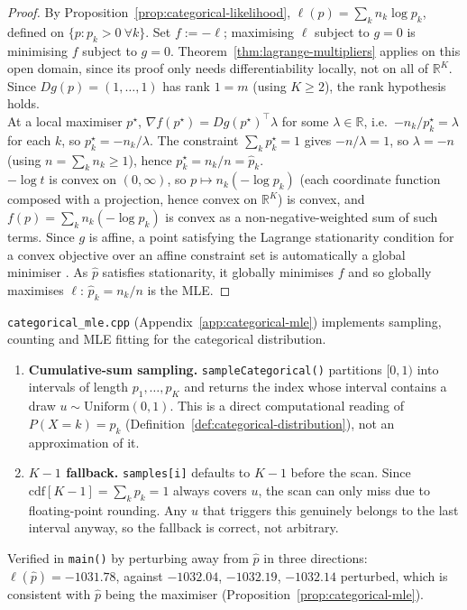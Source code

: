 		\begin{proof}
			By Proposition~\ref{prop:categorical-likelihood}, $\ell(p)=\sum_kn_k\log p_k$, defined on $\{p:p_k>0\ \forall k\}$. Set $f:=-\ell$; maximising $\ell$ subject to $g=0$ is minimising $f$ subject to $g=0$. Theorem~\ref{thm:lagrange-multipliers} applies on this open domain, since its proof only needs differentiability locally, not on all of $\mathbb{R}^K$. Since $Dg(p)=(1,\dots,1)$ has rank $1=m$ (using $K\ge2$), the rank hypothesis holds. \\
			
			At a local maximiser $p^\star$, $\nabla f(p^\star)=Dg(p^\star)^\top\lambda$ for some $\lambda\in\mathbb{R}$, i.e.\ $-n_k/p_k^\star=\lambda$ for each $k$, so $p_k^\star=-n_k/\lambda$. The constraint $\sum_kp_k^\star=1$ gives $-n/\lambda=1$, so $\lambda=-n$ (using $n=\sum_kn_k\ge1$), hence $p_k^\star=n_k/n=\hat p_k$. \\
			
			$-\log t$ is convex on $(0,\infty)$, so $p\mapsto n_k(-\log p_k)$ (each coordinate function composed with a projection, hence convex on $\mathbb{R}^K$) is convex, and $f(p)=\sum_kn_k(-\log p_k)$ is convex as a non-negative-weighted sum of such terms. Since $g$ is affine, a point satisfying the Lagrange stationarity condition for a convex objective over an affine constraint set is automatically a global minimiser \citep{BoydVandenberghe2004}. As $\hat p$ satisfies stationarity, it globally minimises $f$ and so globally maximises $\ell$: $\hat p_k=n_k/n$ is the MLE.
		\end{proof}
		
		\begin{compremark}
			\texttt{categorical\_mle.cpp} (Appendix~\ref{app:categorical-mle}) implements sampling, counting and MLE fitting for the categorical distribution.
			
			\begin{enumerate}[label=\roman*.]
				\item \textbf{Cumulative-sum sampling.} \texttt{sampleCategorical()} partitions $[0,1)$ into intervals of length $p_1,\dots,p_K$ and returns the index whose interval contains a draw $u\sim\mathrm{Uniform}(0,1)$. This is a direct computational reading of $P(X=k)=p_k$ (Definition~\ref{def:categorical-distribution}), not an approximation of it.
				\item \textbf{$K{-}1$ fallback.} \texttt{samples[i]} defaults to $K{-}1$ before the scan. Since $\mathrm{cdf}[K{-}1]=\sum_kp_k=1$ always covers $u$, the scan can only miss due to floating-point rounding. Any $u$ that triggers this genuinely belongs to the last interval anyway, so the fallback is correct, not arbitrary.
			\end{enumerate}
			
			Verified in \texttt{main()} by perturbing away from $\hat p$ in three directions: $\ell(\hat p)=-1031.78$, against $-1032.04$, $-1032.19$, $-1032.14$ perturbed, which is consistent with $\hat p$ being the maximiser (Proposition~\ref{prop:categorical-mle}).
		\end{compremark}
		
